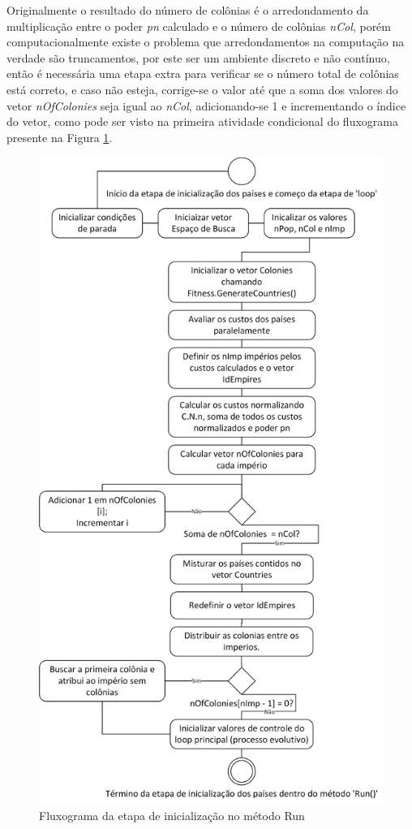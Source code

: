 Originalmente o resultado do número de colônias é o arredondamento da multiplicação entre o poder \emph{pn} calculado e o número de colônias \emph{nCol}, porém computacionalmente existe o problema que arredondamentos na computação na verdade são truncamentos, por este ser um ambiente discreto e não contínuo, então é necessária uma etapa extra para verificar se o número total de colônias está correto, e caso não esteja, corrige-se o valor até que a soma dos valores do vetor \emph{nOfColonies} seja igual ao \emph{nCol}, adicionando-se 1 e incrementando o índice do vetor, como pode ser visto na primeira atividade condicional do fluxograma presente na Figura \ref{fig:Fluxograms-RunMethodStart}.

 \begin{figure}[h]
	\centering	
	\includegraphics[scale=0.7]{Figuras/Fluxograms-RunMethodStart.png}
	\caption{Fluxograma da etapa de inicialização no método Run}
	\label{fig:Fluxograms-RunMethodStart}
	\end{figure}
    
